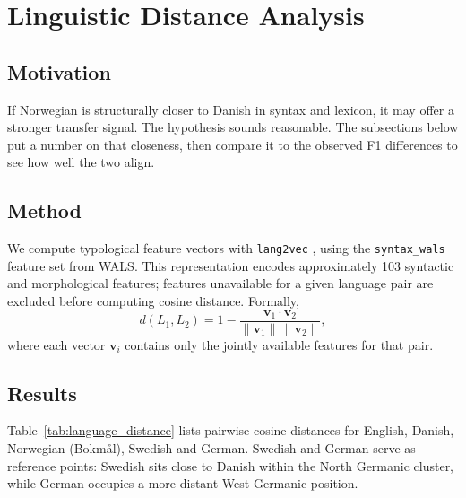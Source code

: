 \section{Linguistic Distance Analysis}

\subsection{Motivation}

If Norwegian is structurally closer to Danish in syntax and lexicon, it may offer a stronger transfer signal. The hypothesis sounds reasonable. The subsections below put a number on that closeness, then compare it to the observed F1 differences to see how well the two align.

\subsection{Method}

We compute typological feature vectors with \texttt{lang2vec} \citep{littell2017uriel}, using the \texttt{syntax\_wals} feature set from WALS. This representation encodes approximately 103 syntactic and morphological features; features unavailable for a given language pair are excluded before computing cosine distance. Formally,
\[
d(L_1, L_2) = 1 - \frac{\mathbf{v}_1 \cdot \mathbf{v}_2}{\|\mathbf{v}_1\|\,\|\mathbf{v}_2\|},
\]
where each vector $\mathbf{v}_i$ contains only the jointly available features for that pair.

\subsection{Results}

Table~\ref{tab:language_distance} lists pairwise cosine distances for English, Danish, Norwegian (Bokm\aa l), Swedish and German. Swedish and German serve as reference points: Swedish sits close to Danish within the North Germanic cluster, while German occupies a more distant West Germanic position.

